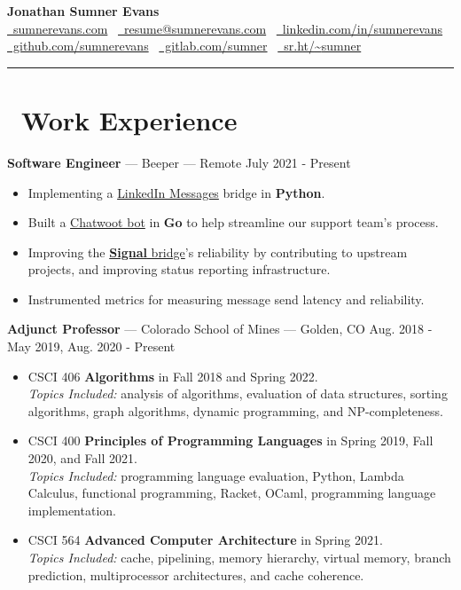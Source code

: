 \documentclass[10pt,letterpaper]{article}
\begin{document}
\begin{center}
    {\huge\textbf{Jonathan Sumner Evans}} \\
    \vspace{3pt}
    \href{https://sumnerevans.com}{\faGlobe\ sumnerevans.com}
    \textbar\ \href{mailto:resume@sumnerevans.com}{\faEnvelope\ resume@sumnerevans.com}
    \textbar\ \href{https://www.linkedin.com/in/sumnerevans}{\faLinkedin\ linkedin.com/in/sumnerevans} \\
    \href{https://github.com/sumnerevans}{\faGithub\ github.com/sumnerevans}
    \textbar\ \href{https://gitlab.com/sumner}{\faGitlab\ gitlab.com/sumner}
    \textbar\ \href{https://sr.ht/~sumner}{\faCodeFork\ sr.ht/{\textasciitilde}sumner}
    \rule{\textwidth}{0.5pt}
\end{center}

\section*{\faBriefcase\ Work Experience}
\textbf{Software Engineer} --- Beeper --- Remote
\hfill July 2021 - Present
\begin{itemize}
    \item Implementing a \href{https://gitlab.com/beeper/linkedin}{LinkedIn
        Messages} bridge in \textbf{Python}.
    \item Built a \href{https://gitlab.com/beeper/chatwoot}{Chatwoot bot}
        in \textbf{Go} to help streamline our support team's process. 
    \item Improving the \href{https://github.com/mautrix/signal}{\textbf{Signal}
        bridge}'s reliability by contributing to upstream projects, and
        improving status reporting infrastructure.
    \item Instrumented metrics for measuring message send latency and
        reliability.
\end{itemize}

\textbf{Adjunct Professor} --- Colorado School of Mines --- Golden, CO
\hfill Aug. 2018 - May 2019, Aug. 2020 - Present
\begin{itemize}
    \item CSCI 406 \textbf{Algorithms} in Fall 2018 and Spring 2022. \\
        \textit{Topics Included:} analysis of algorithms, evaluation of data
        structures, sorting algorithms, graph algorithms, dynamic programming,
        and NP-completeness.
    \item CSCI 400 \textbf{Principles of Programming Languages} in Spring
        2019, Fall 2020, and Fall 2021. \\
        \textit{Topics Included:} programming language evaluation, Python,
        Lambda Calculus, functional programming, Racket, OCaml, programming
        language implementation.
    \item CSCI 564 \textbf{Advanced Computer Architecture} in Spring
        2021. \\
        \textit{Topics Included:} cache, pipelining, memory hierarchy, virtual
        memory, branch prediction, multiprocessor architectures, and cache
        coherence.
\end{itemize}
\end{document}
